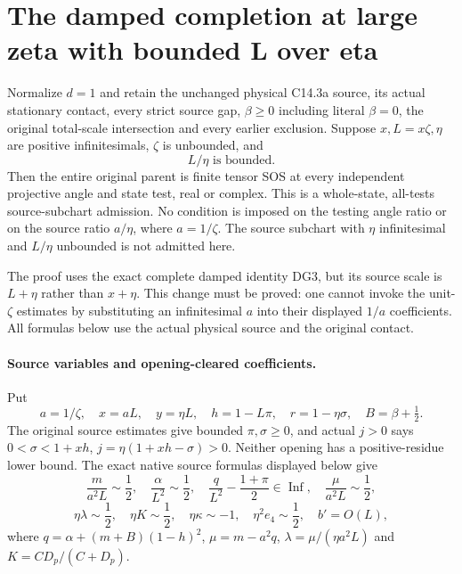 \section{\texorpdfstring{The damped completion at large zeta with bounded L over eta}{The damped completion at large zeta with bounded L over eta}}
\label{component:pc720c1e06aca}

\label{pc720c1e06aca:sec:r17-large-zeta-damped}

\begin{theorem}
Normalize $d=1$ and retain the unchanged physical C14.3a source,
its actual stationary contact, every strict source gap,
$\beta\ge0$ including literal $\beta=0$, the original total-scale
intersection and every earlier exclusion. Suppose $x,L=x\zeta,\eta$
are positive infinitesimals, $\zeta$ is unbounded, and
\[
                         L/\eta\text{ is bounded}.       \tag{LD1}
\]
Then the entire original parent is finite tensor SOS at every independent
projective angle and state test, real or complex. This is a whole-state,
all-tests source-subchart admission. No condition is imposed on the
testing angle ratio or on the source ratio $a/\eta$, where $a=1/\zeta$.
The source subchart with $\eta$ infinitesimal and $L/\eta$ unbounded
is not admitted here.
\end{theorem}

The proof uses the exact complete damped identity DG3, but its source
scale is $L+\eta$ rather than $x+\eta$. This change must be proved:
one cannot invoke the unit-$\zeta$ estimates by substituting an
infinitesimal $a$ into their displayed $1/a$ coefficients. All formulas
below use the actual physical source and the original contact.

\paragraph{Source variables and opening-cleared coefficients.}
Put
\[
 a=1/\zeta,\quad x=aL,\quad y=\eta L,\quad
 h=1-L\pi,\quad r=1-\eta\sigma,\quad B=\beta+\tfrac12.
\]
The original source estimates give bounded $\pi,\sigma\ge0$, and
actual $j>0$ says
$0<\sigma<1+xh$, $j=\eta(1+xh-\sigma)>0$.
Neither opening has a positive-residue lower bound.
The exact native source formulas displayed below give
\[
 \frac{m}{a^2L}\sim\frac12,\quad
 \frac{\alpha}{L^2}\sim\frac12,\quad
 \frac{q}{L^2}-\frac{1+\pi}{2}\in\operatorname{Inf},\quad
 \frac{\mu}{a^2L}\sim\frac12,
\]
\[
 \eta\lambda\sim\frac12,\quad
 \eta K\sim\frac12,\quad
 \eta\kappa\sim-1,\quad \eta^2e_4\sim\frac12,
 \quad b'=O(L),                                     \tag{LD2}
\]
where $q=\alpha+(m+B)(1-h)^2$, $\mu=m-a^2q$,
$\lambda=\mu/(\eta a^2L)$ and $K=CD_p/(C+D_p)$.

